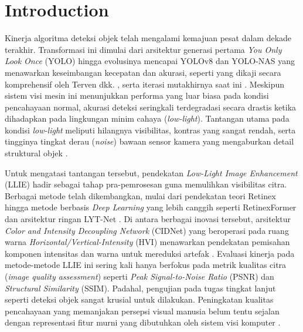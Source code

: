 \documentclass[conference]{IEEEtran}
\begin{document}

\section{Introduction} 
Kinerja algoritma deteksi objek telah mengalami kemajuan pesat dalam dekade terakhir. Transformasi ini dimulai dari arsitektur generasi pertama \textit{You Only Look Once} (YOLO) \cite{redmon2016yolo} hingga evolusinya mencapai YOLOv8 dan YOLO-NAS yang menawarkan keseimbangan kecepatan dan akurasi, seperti yang dikaji secara komprehensif oleh Terven dkk. \cite{terven2023yoloreview}, serta iterasi mutakhirnya saat ini \cite{sapkota2025yoloreview}. Meskipun sistem visi mesin ini menunjukkan performa yang luar biasa pada kondisi pencahayaan normal, akurasi deteksi seringkali terdegradasi secara drastis ketika dihadapkan pada lingkungan minim cahaya (\textit{low-light}). Tantangan utama pada kondisi \textit{low-light} meliputi hilangnya visibilitas, kontras yang sangat rendah, serta tingginya tingkat derau (\textit{noise}) bawaan sensor kamera yang mengaburkan detail struktural objek \cite{goodfellow2016,loh2019exdark,hong2021lowlight,gong2025multiscale}.

Untuk mengatasi tantangan tersebut, pendekatan \textit{Low-Light Image Enhancement} (LLIE) hadir sebagai tahap pra-pemrosesan guna memulihkan visibilitas citra. Berbagai metode telah dikembangkan, mulai dari pendekatan teori Retinex hingga metode berbasis \textit{Deep Learning} yang lebih canggih seperti RetinexFormer \cite{cai2023retinexformer} dan arsitektur ringan LYT-Net \cite{brateanu2025lytnet}. Di antara berbagai inovasi tersebut, arsitektur \textit{Color and Intensity Decoupling Network} (CIDNet) yang beroperasi pada ruang warna \textit{Horizontal/Vertical-Intensity} (HVI) menawarkan pendekatan pemisahan komponen intensitas dan warna untuk mereduksi artefak \cite{yan2025hvi}. Evaluasi kinerja pada metode-metode LLIE ini sering kali hanya berfokus pada metrik kualitas citra (\textit{image quality assessment}) seperti \textit{Peak Signal-to-Noise Ratio} (PSNR) dan \textit{Structural Similarity} (SSIM). Padahal, pengujian pada tugas tingkat lanjut seperti deteksi objek sangat krusial untuk dilakukan. Peningkatan kualitas pencahayaan yang memanjakan persepsi visual manusia belum tentu sejalan dengan representasi fitur murni yang dibutuhkan oleh sistem visi komputer \cite{wu2024llieeffect,liu2021benchmark}.
\end{document}
